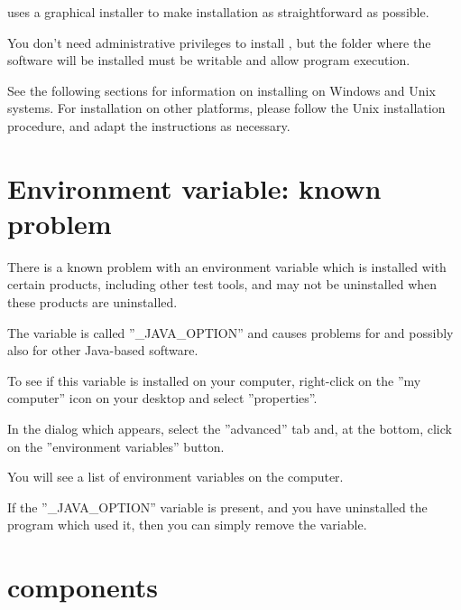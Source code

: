 
\app{} uses a graphical installer to make installation as straightforward as possible. 

You don't need administrative privileges to install \app{}, but the folder where the software will be installed must be writable and allow program execution.

See the following sections for information on installing \app{} on Windows and Unix systems. For installation on  other platforms, please follow the Unix installation procedure, and adapt the instructions as necessary.

\section{Environment variable: known problem}
There is a known problem with an environment variable which is installed with certain products, including other test tools, and may not be uninstalled when these products are uninstalled. 

The variable is called ''\_JAVA\_OPTION'' and causes problems for \app{} and possibly also for other Java-based software.

To see if this variable is installed on your computer, right-click on the ''my computer'' icon on your desktop and select ''properties''. 

In the dialog which appears, select the ''advanced'' tab and, at the bottom, click on the ''environment variables'' button. 

You will see a list of environment variables on the computer. 

If the ''\_JAVA\_OPTION'' variable is present, and you have uninstalled the program which used it, then you can simply remove the variable.


\section{\app{} components}



